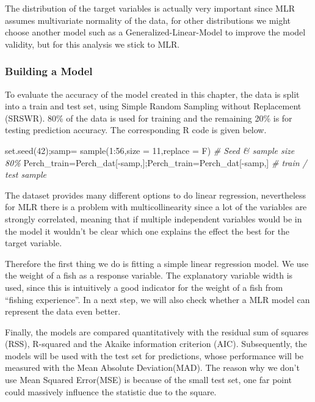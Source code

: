 \documentclass[
]{article}
\newenvironment{Shaded}{\begin{snugshade}}{\end{snugshade}}
\newcommand{\AttributeTok}[1]{\textcolor[rgb]{0.77,0.63,0.00}{#1}}
\newcommand{\CommentTok}[1]{\textcolor[rgb]{0.56,0.35,0.01}{\textit{#1}}}
\newcommand{\DecValTok}[1]{\textcolor[rgb]{0.00,0.00,0.81}{#1}}
\newcommand{\FunctionTok}[1]{\textcolor[rgb]{0.00,0.00,0.00}{#1}}
\newcommand{\NormalTok}[1]{#1}
\newcommand{\OtherTok}[1]{\textcolor[rgb]{0.56,0.35,0.01}{#1}}
\newcommand{\SpecialCharTok}[1]{\textcolor[rgb]{0.00,0.00,0.00}{#1}}
\begin{document}
The distribution of the target variables is actually very important
since MLR assumes multivariate normality of the data, for other
distributions we might choose another model such as a
Generalized-Linear-Model to improve the model validity, but for this
analysis we stick to MLR.

\hypertarget{building-a-model}{%
\subsubsection{Building a Model}\label{building-a-model}}

To evaluate the accuracy of the model created in this chapter, the data
is split into a train and test set, using Simple Random Sampling without
Replacement (SRSWR). 80\% of the data is used for training and the
remaining 20\% is for testing prediction accuracy. The corresponding R
code is given below.

\begin{Shaded}
\begin{Highlighting}[]
\FunctionTok{set.seed}\NormalTok{(}\DecValTok{42}\NormalTok{);samp}\OtherTok{=} \FunctionTok{sample}\NormalTok{(}\DecValTok{1}\SpecialCharTok{:}\DecValTok{56}\NormalTok{,}\AttributeTok{size =} \DecValTok{11}\NormalTok{,}\AttributeTok{replace =}\NormalTok{ F)       }\CommentTok{\# Seed \& sample size 80\%}
\NormalTok{Perch\_train}\OtherTok{=}\NormalTok{Perch\_dat[}\SpecialCharTok{{-}}\NormalTok{samp,];Perch\_train}\OtherTok{=}\NormalTok{Perch\_dat[}\SpecialCharTok{{-}}\NormalTok{samp,] }\CommentTok{\# train / test sample}
\end{Highlighting}
\end{Shaded}

The dataset provides many different options to do linear regression,
nevertheless for MLR there is a problem with multicollinearity since a
lot of the variables are strongly correlated, meaning that if multiple
independent variables would be in the model it wouldn't be clear which
one explains the effect the best for the target variable.

Therefore the first thing we do is fitting a simple linear regression
model. We use the weight of a fish as a response variable. The
explanatory variable width is used, since this is intuitively a good
indicator for the weight of a fish from ``fishing experience''. In a
next step, we will also check whether a MLR model can represent the data
even better.

Finally, the models are compared quantitatively with the residual sum of
squares (RSS), R-squared and the Akaike information criterion (AIC).
Subsequently, the models will be used with the test set for predictions,
whose performance will be measured with the Mean Absolute
Deviation(MAD). The reason why we don't use Mean Squared Error(MSE) is
because of the small test set, one far point could massively influence
the statistic due to the square.
\end{document}
